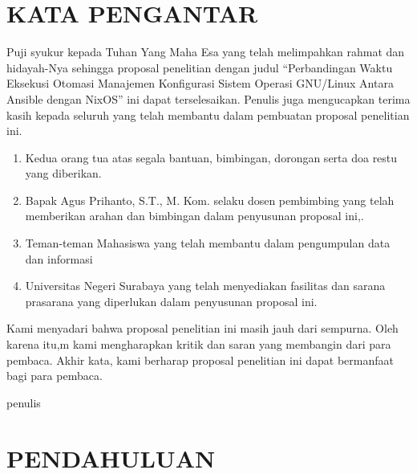 \documentclass[10pt,]{report}
\begin{document}

\chapter*{KATA PENGANTAR}
\begin{justify}
	Puji syukur kepada Tuhan Yang Maha Esa yang telah melimpahkan rahmat dan
	hidayah-Nya sehingga proposal penelitian dengan judul “Perbandingan
	Waktu Eksekusi Otomasi Manajemen Konfigurasi Sistem Operasi GNU/Linux Antara Ansible dengan NixOS” ini
	dapat terselesaikan. Penulis juga mengucapkan terima kasih kepada seluruh
	yang telah membantu dalam pembuatan proposal penelitian ini.
	\begin{enumerate}[leftmargin=0.45cm]
		\item Kedua orang tua atas segala bantuan, bimbingan, dorongan serta doa restu yang diberikan.
		\item Bapak Agus Prihanto, S.T., M. Kom. selaku dosen pembimbing yang telah memberikan arahan dan bimbingan dalam penyusunan proposal ini,.
		\item Teman-teman Mahasiswa yang telah membantu dalam pengumpulan data dan informasi
		\item Universitas Negeri Surabaya yang telah menyediakan fasilitas dan sarana prasarana yang diperlukan dalam penyusunan proposal ini.
	\end{enumerate}
	Kami menyadari bahwa proposal penelitian ini masih jauh dari sempurna. Oleh karena itu,m kami mengharapkan kritik dan saran yang membangin dari para pembaca.
	Akhir kata, kami berharap proposal penelitian ini dapat bermanfaat bagi para pembaca.
\end{justify}
\begin{FlushRight}
	penulis
\end{FlushRight}
\tableofcontents
\newpage
\listoftables
\newpage
\listoffigures
\newpage
\chapter{PENDAHULUAN}
\end{document}
